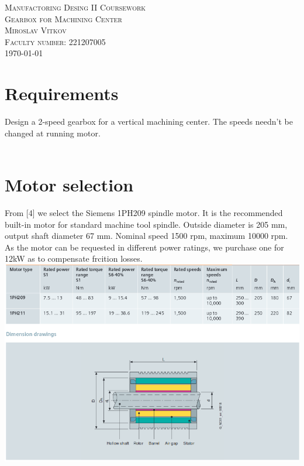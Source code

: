 \documentclass{article}
\begin{document}
\begin{titlepage}
\begin{center}
\textsc{\Large Manufactoring Desing II Coursework}\\[1cm]
\textsc{\Huge Gearbox for Machining Center}\\[1.5cm]
\textsc{\Large Miroslav Vitkov}\\[0.5cm]
\textsc{Faculty number: 221207005}\\[1.5cm]
\vfill
\today
\end{center}
\end{titlepage}

\section{Requirements}
Design a 2-speed gearbox for a vertical machining center.
The speeds needn't be changed at running motor. \\
          \\

\section{Motor selection}
From [4] we select the Siemens 1PH209 spindle motor.
It is the recommended built-in motor for standard machine tool spindle.
Outside diameter is 205 mm, output shaft diameter 67 mm.
Nominal speed 1500 rpm, maximum 10000 rpm.
As the motor can be requested in different power ratings, we purchase one for 12kW as to compensate frcition losses.
\\
\includegraphics[width=1.25\textwidth]{images/motor}~
\end{document}
